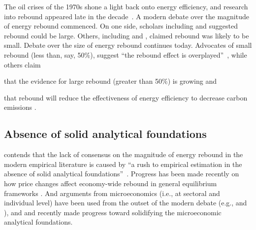 \documentclass[12pt]{article}\usepackage[]{graphicx}\usepackage[]{xcolor}
\begin{document}
The oil crises of the 1970s shone a light back onto energy efficiency, and 
research into rebound appeared late in the decade~\citep{Madlener:2016to, Saunders:2021te}. 
A modern debate over the magnitude of energy rebound commenced. 
On one side, scholars including \citet{Brookes1979, Brookes1990} and \citet{Khazzoom1980} 
suggested rebound could be large.
Others, including \citet{Lovins1988} and \citet{Grubb1990, Grubb1992},
claimed rebound was likely to be small.
Debate over the size of energy rebound continues today.
Advocates of small rebound (less than, say, 50\%),
suggest ``the rebound effect is overplayed''~\citep[p.~475]{Gillingham:2013aa},
while others claim
%
\begin{enumerate*}[label={(\roman*)}]
	
  \item that the evidence for large rebound
        (greater than 50\%) is growing 
        \citep{Saunders2015, Berner:2022tb} and
  
  \item that rebound will reduce the effectiveness of energy efficiency
        to decrease carbon emissions
        \citep{van-den-Bergh:2017aa}.
    
\end{enumerate*}


\subsection{Absence of solid analytical foundations}
\label{sec:absence_of_foundations}

\citeauthor{Turner:2013aa} contends that the lack of consensus 
on the magnitude of energy rebound 
in the modern empirical literature is caused by 
``a rush to empirical estimation in the absence 
of solid analytical foundations''~\citep[p.~25]{Turner:2013aa}.
Progress has been made recently on how price changes 
affect economy-wide rebound 
in general equilibrium frameworks
\citep{Lemoine:2020aa, Fullerton2020, blackburn2020energy}.
And arguments from microeconomics (i.e., at sectoral and individual level) have
been used from the outset of the modern debate 
(e.g., \citet{Khazzoom1980} and \citet{Greening2000}),
and \citet{Borenstein:2015aa} and \citet{Chan2015}
recently made progress toward solidifying the microeconomic analytical foundations. 
\end{document}
